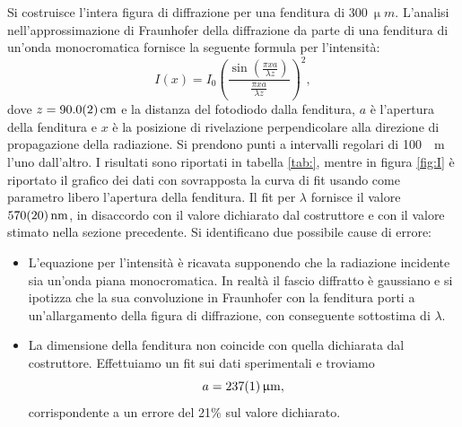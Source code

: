 \documentclass[10pt,oneside,a4paper]{article}
\begin{document}
\begin{multicols}{2}
Si costruisce l'intera figura di diffrazione per una fenditura di $\SI{300}{\upmu m}$. L'analisi nell'approssimazione di Fraunhofer della diffrazione da parte di una fenditura di un'onda monocromatica fornisce la seguente formula per l'intensità:
\begin{equation}\label{eq:slit_diffraction_figure}
I(x) = I_0\left (\frac{\sin\left(\frac{\pi xa}{\lambda z}\right)}{\frac{\pi xa}{\lambda z}}\right)^2,
\end{equation}
dove $z = \SI{90.0 \pm 0.2}{cm}$ e la distanza del fotodiodo dalla fenditura, $a$ è l'apertura della fenditura e $x$ è la posizione di rivelazione perpendicolare alla direzione di propagazione della radiazione.
Si prendono punti a intervalli regolari di \SI{100}{\upmu m} l'uno dall'altro. I risultati sono riportati in tabella \ref{tab:}, mentre in figura \ref{fig:I} è riportato il grafico dei dati con sovrapposta la curva di fit usando come parametro libero l'apertura della fenditura. Il fit per $\lambda$ fornisce il valore $\SI{570 \pm 20}{nm}$, in disaccordo con il valore dichiarato dal costruttore e con il valore stimato nella sezione precedente. Si identificano due possibile cause di errore:
\begin{itemize}
\item L'equazione per l'intensità è ricavata supponendo che la radiazione incidente sia un'onda piana monocromatica. In realtà il fascio diffratto è gaussiano e si ipotizza che la sua convoluzione in Fraunhofer con la fenditura porti a un'allargamento della figura di diffrazione, con conseguente sottostima di $\lambda$.
\item La dimensione della fenditura non coincide con quella dichiarata dal costruttore. Effettuiamo un fit sui dati sperimentali e troviamo $$a = \SI{237 \pm 1}{\upmu m},$$ corrispondente a un errore del 21\% sul valore dichiarato.
\end{itemize}


\end{multicols}
\end{document}
